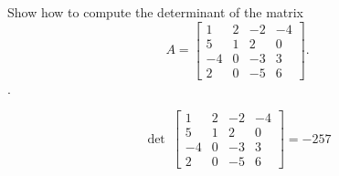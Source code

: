 
\begin{exerciseStatement}


Show how to compute the determinant of the matrix \[A= \left[\begin{array}{cccc}
1 & 2 & -2 & -4 \\
5 & 1 & 2 & 0 \\
-4 & 0 & -3 & 3 \\
2 & 0 & -5 & 6
\end{array}\right] .\].


\end{exerciseStatement}
    
\begin{exerciseAnswer} 
\[\operatorname{det}\  \left[\begin{array}{cccc}
1 & 2 & -2 & -4 \\
5 & 1 & 2 & 0 \\
-4 & 0 & -3 & 3 \\
2 & 0 & -5 & 6
\end{array}\right] = -257 \]
\end{exerciseAnswer}
    
